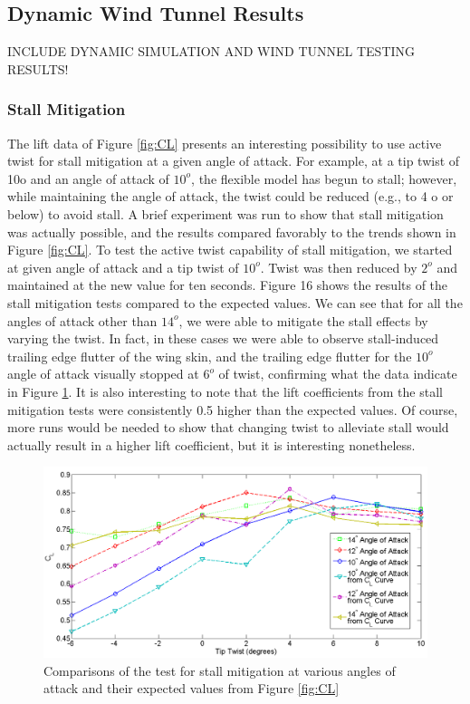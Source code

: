 \documentclass[11pt]{ucthesis}
\begin{document}
\subsection{Dynamic Wind Tunnel Results}
{\color{red} INCLUDE DYNAMIC SIMULATION AND WIND TUNNEL TESTING RESULTS!}
\subsubsection{Stall Mitigation}

The lift data of Figure \ref{fig:CL} presents an interesting possibility to use active twist for stall mitigation at a given angle of attack. For example, at a tip twist of 10o and an angle of attack of $10^o$, the flexible model has begun to stall; however, while maintaining the angle of attack, the twist could be reduced (e.g., to 4 o or below) to avoid stall. A brief experiment was run to show that stall mitigation was actually possible, and the results compared favorably to the trends shown in Figure \ref{fig:CL}.
To test the active twist capability of stall mitigation, we started at given angle of attack and a tip twist of $10^o$. Twist was then reduced by $2^o$ and maintained at the new value for ten seconds. Figure 16 shows the results of the stall mitigation tests compared to the expected values. We can see that for all the angles of attack other than $14^o$, we were able to mitigate the stall effects by varying the twist. In fact, in these cases we were able to observe stall-induced trailing edge flutter of the wing skin, and the trailing edge flutter for the $10^o$ angle of attack visually stopped at $6^o$ of twist, confirming what the data indicate in Figure \ref{fig:SM}. It is also interesting to note that the lift coefficients from the stall mitigation tests were consistently 0.5 higher than the expected values. Of course, more runs would be needed to show that changing twist to alleviate stall would actually result in a higher lift coefficient, but it is interesting nonetheless.

\begin{figure}[h]
\centering
\includegraphics[width=1\linewidth]{Figures/StallMitigationCompare.png}
\caption{Comparisons of the test for stall mitigation at various angles of attack and their expected values from Figure \ref{fig:CL}}
\label{fig:SM}
\end{figure}
\end{document}
